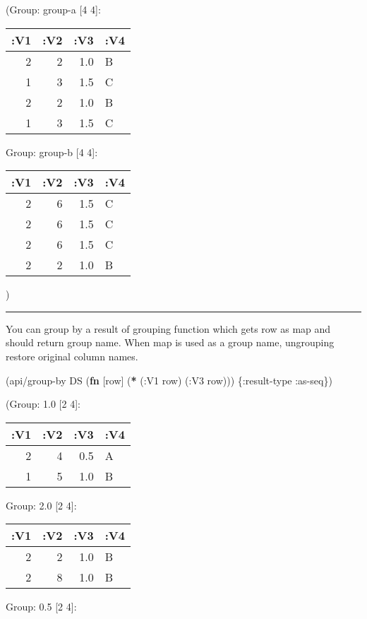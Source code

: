\documentclass[]{article}
\newenvironment{Shaded}{\begin{snugshade}}{\end{snugshade}}
\newcommand{\KeywordTok}[1]{\textcolor[rgb]{0.13,0.29,0.53}{\textbf{#1}}}
\newcommand{\AttributeTok}[1]{\textcolor[rgb]{0.77,0.63,0.00}{#1}}
\newcommand{\NormalTok}[1]{#1}
\begin{document}
(Group: group-a {[}4 4{]}:

\begin{longtable}[]{@{}rrrl@{}}
\toprule
:V1 & :V2 & :V3 & :V4\tabularnewline
\midrule
\endhead
2 & 2 & 1.0 & B\tabularnewline
1 & 3 & 1.5 & C\tabularnewline
2 & 2 & 1.0 & B\tabularnewline
1 & 3 & 1.5 & C\tabularnewline
\bottomrule
\end{longtable}

Group: group-b {[}4 4{]}:

\begin{longtable}[]{@{}rrrl@{}}
\toprule
:V1 & :V2 & :V3 & :V4\tabularnewline
\midrule
\endhead
2 & 6 & 1.5 & C\tabularnewline
2 & 6 & 1.5 & C\tabularnewline
2 & 6 & 1.5 & C\tabularnewline
2 & 2 & 1.0 & B\tabularnewline
\bottomrule
\end{longtable}

)

\begin{center}\rule{0.5\linewidth}{0.5pt}\end{center}

You can group by a result of grouping function which gets row as map and
should return group name. When map is used as a group name, ungrouping
restore original column names.

\begin{Shaded}
\begin{Highlighting}[]
\NormalTok{(api/group-by DS (}\KeywordTok{fn}\NormalTok{ [row] (}\KeywordTok{*}\NormalTok{ (}\AttributeTok{:V1}\NormalTok{ row)}
\NormalTok{                             (}\AttributeTok{:V3}\NormalTok{ row))) \{}\AttributeTok{:result-type} \AttributeTok{:as-seq}\NormalTok{\})}
\end{Highlighting}
\end{Shaded}

(Group: 1.0 {[}2 4{]}:

\begin{longtable}[]{@{}rrrl@{}}
\toprule
:V1 & :V2 & :V3 & :V4\tabularnewline
\midrule
\endhead
2 & 4 & 0.5 & A\tabularnewline
1 & 5 & 1.0 & B\tabularnewline
\bottomrule
\end{longtable}

Group: 2.0 {[}2 4{]}:

\begin{longtable}[]{@{}rrrl@{}}
\toprule
:V1 & :V2 & :V3 & :V4\tabularnewline
\midrule
\endhead
2 & 2 & 1.0 & B\tabularnewline
2 & 8 & 1.0 & B\tabularnewline
\bottomrule
\end{longtable}

Group: 0.5 {[}2 4{]}:
\end{document}
